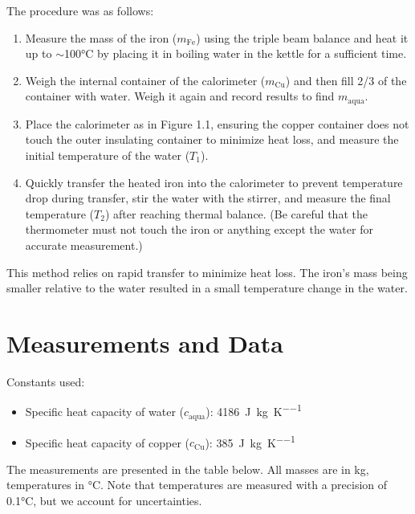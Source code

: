 \documentclass[12pt, a4paper]{article}
\begin{document}
The procedure was as follows:
\begin{enumerate}
\item Measure the mass of the iron ($m_{\text{Fe}}$) using the triple beam balance and heat it up to $\sim$100°C by placing it in boiling water in the kettle for a sufficient time.
\item Weigh the internal container of the calorimeter ($m_{\text{Cu}}$) and then fill 2/3 of the container with water. Weigh it again and record results to find $m_{\text{aqua}}$.
\item Place the calorimeter as in Figure 1.1, ensuring the copper container does not touch the outer insulating container to minimize heat loss, and measure the initial temperature of the water ($T_1$).
\item Quickly transfer the heated iron into the calorimeter to prevent temperature drop during transfer, stir the water with the stirrer, and measure the final temperature ($T_2$) after reaching thermal balance. (Be careful that the thermometer must not touch the iron or anything except the water for accurate measurement.)
\end{enumerate}

This method relies on rapid transfer to minimize heat loss. The iron's mass being smaller relative to the water resulted in a small temperature change in the water.

\section{Measurements and Data}
Constants used:
\begin{itemize}
	\item Specific heat capacity of water ($c_{\text{aqua}}$): \SI{4186}{\joule\per\kilo\gram\per\kelvin}
	\item Specific heat capacity of copper ($c_{\text{Cu}}$): \SI{385}{\joule\per\kilo\gram\per\kelvin}
\end{itemize}

The measurements are presented in the table below. All masses are in kg, temperatures in °C. Note that temperatures are measured with a precision of 0.1°C, but we account for uncertainties.
\end{document}
